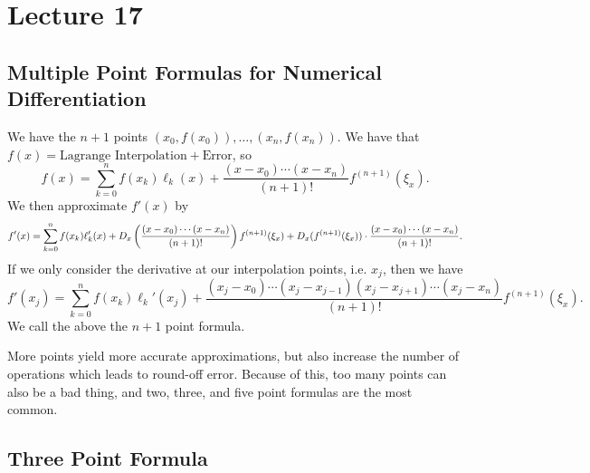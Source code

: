 \documentclass[class=article, crop=false]{standalone}
\begin{document}
  \section{Lecture 17}
  \subsection{Multiple Point Formulas for Numerical Differentiation}
  We have the $n + 1$ points $(x_0, f(x_0)),\dotsc,(x_n, f(x_n))$. We have that $f(x) = \text{Lagrange Interpolation} + \text{Error}$, so
  \[
    f(x) = \sum_{k=0}^{n}f(x_k)\ell_k(x) + \frac{(x - x_0)\dotsb(x - x_n)}{(n + 1)!}f^{(n + 1)}(\xi_x).\tag*{$\xi_x\in (x_0, x_n)$}
  \]
  We then approximate $f'(x)$ by
  \[
    f'(x) = \sum_{k=0}^{n} f(x_k)\ell_k'(x) + D_x\left( \frac{(x - x_0)\dotsb(x - x_n)}{(n + 1)!} \right)f^{(n + 1)}(\xi_x) + D_x(f^{(n + 1)}(\xi_x))\cdot \frac{(x - x_0)\dotsb(x - x_n)}{(n + 1)!}.
  \]
  If we only consider the derivative at our interpolation points, i.e. $x_j$, then we have
  \[
    f'(x_j) = \sum_{k=0}^{n} f(x_k)\ell_k'(x_j) + \frac{(x_j - x_0)\dotsb(x_j - x_{j - 1})(x_j - x_{j + 1})\dotsb(x_j - x_n)}{(n + 1)!}f^{(n + 1)}(\xi_x).
  \]
  We call the above the $n + 1$ point formula.
  \begin{note}{}
    More points yield more accurate approximations, but also increase the number of operations which leads to round-off error. Because of this, too many points can also be a bad thing, and two, three, and five point formulas are the most common.
  \end{note}
  \subsection{Three Point Formula}
\end{document}
